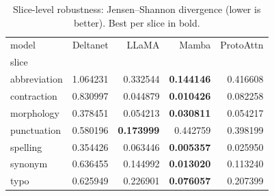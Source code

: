 \begin{table}
\caption{Slice-level robustness: Jensen--Shannon divergence (lower is better). Best per slice in bold.}
\label{tab:robustness_slices}
\begin{tabular}{lrrrr}
\toprule
model & Deltanet & LLaMA & Mamba & ProtoAttn \\
slice &  &  &  &  \\
\midrule
abbreviation & 1.064231 & 0.332544 & \textbf{0.144146} & 0.416608 \\
contraction & 0.830997 & 0.044879 & \textbf{0.010426} & 0.082258 \\
morphology & 0.378451 & 0.054213 & \textbf{0.030811} & 0.054217 \\
punctuation & 0.580196 & \textbf{0.173999} & 0.442759 & 0.398199 \\
spelling & 0.354426 & 0.063446 & \textbf{0.005357} & 0.025950 \\
synonym & 0.636455 & 0.144992 & \textbf{0.013020} & 0.113240 \\
typo & 0.625949 & 0.226901 & \textbf{0.076057} & 0.207399 \\
\bottomrule
\end{tabular}
\end{table}
